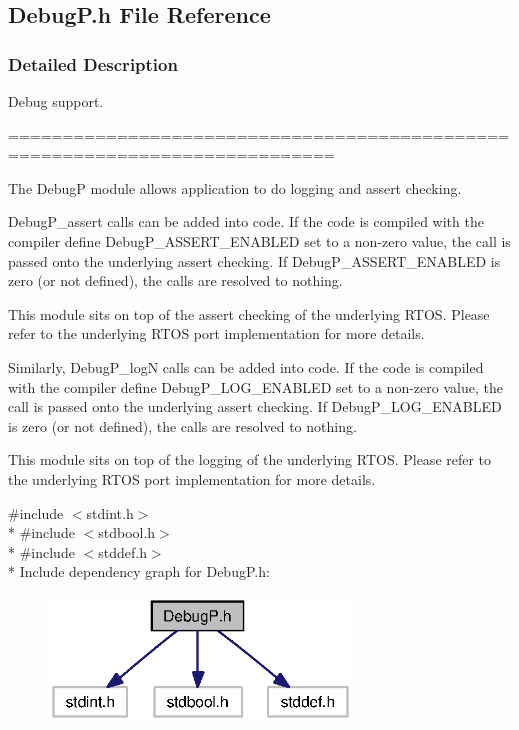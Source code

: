 \subsection{Debug\+P.\+h File Reference}
\label{_debug_p_8h}


\subsubsection{Detailed Description}
Debug support. 

============================================================================

The Debug\+P module allows application to do logging and assert checking.

Debug\+P\+\_\+assert calls can be added into code. If the code is compiled with the compiler define Debug\+P\+\_\+\+A\+S\+S\+E\+R\+T\+\_\+\+E\+N\+A\+B\+L\+E\+D set to a non-\/zero value, the call is passed onto the underlying assert checking. If Debug\+P\+\_\+\+A\+S\+S\+E\+R\+T\+\_\+\+E\+N\+A\+B\+L\+E\+D is zero (or not defined), the calls are resolved to nothing.

This module sits on top of the assert checking of the underlying R\+T\+O\+S. Please refer to the underlying R\+T\+O\+S port implementation for more details.

Similarly, Debug\+P\+\_\+log\+N calls can be added into code. If the code is compiled with the compiler define Debug\+P\+\_\+\+L\+O\+G\+\_\+\+E\+N\+A\+B\+L\+E\+D set to a non-\/zero value, the call is passed onto the underlying assert checking. If Debug\+P\+\_\+\+L\+O\+G\+\_\+\+E\+N\+A\+B\+L\+E\+D is zero (or not defined), the calls are resolved to nothing.

This module sits on top of the logging of the underlying R\+T\+O\+S. Please refer to the underlying R\+T\+O\+S port implementation for more details. 

{\ttfamily \#include $<$stdint.\+h$>$}\\*
{\ttfamily \#include $<$stdbool.\+h$>$}\\*
{\ttfamily \#include $<$stddef.\+h$>$}\\*
Include dependency graph for Debug\+P.\+h\+:
\nopagebreak
\begin{figure}[H]
\begin{center}
\leavevmode
\includegraphics[width=229pt]{_debug_p_8h__incl}
\end{center}
\end{figure}
